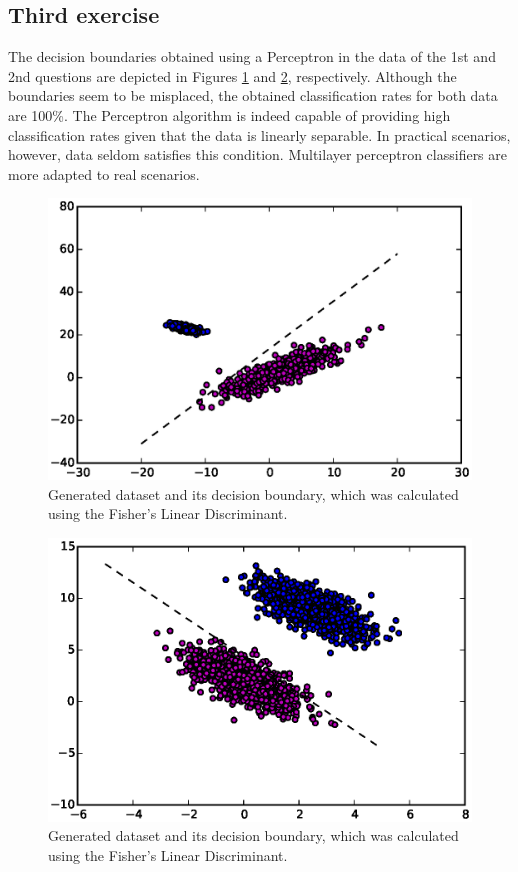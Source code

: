 \documentclass[a4paper,10pt]{article}
\begin{document}
\subsection*{Third exercise}
The decision boundaries obtained using a Perceptron in the data of the 1st and 2nd questions are depicted in Figures \ref{fig:3f1} and \ref{fig:3f2}, respectively. Although the boundaries seem to be misplaced, the obtained classification rates for both data are 100\%. The Perceptron algorithm is indeed capable of providing high classification rates given that the data is linearly separable. In practical scenarios, however, data seldom satisfies this condition. Multilayer perceptron classifiers are more adapted to real scenarios.
\begin{figure}[htb]
 \centering
 \includegraphics[scale=0.6]{./figures/3f1.eps}
 \caption{Generated dataset and its decision boundary, which was calculated using the Fisher's Linear Discriminant.}
 \label{fig:3f1}
\end{figure}
\begin{figure}[htb]
 \centering
 \includegraphics[scale=0.6]{./figures/3f2.eps}
 \caption{Generated dataset and its decision boundary, which was calculated using the Fisher's Linear Discriminant.}
 \label{fig:3f2}
\end{figure}
\end{document}
